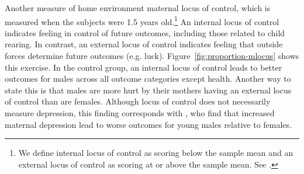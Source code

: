 Another measure of home environment maternal locus of control, which is measured when the subjects were 1.5 years old.\footnote{We define internal locus of control as scoring below the sample mean and an external locus of control as scoring at or above the sample mean. See \citet{Rotter_1966_PMGaA}.} An internal locus of control indicates feeling in control of future outcomes, including those related to child rearing. In contrast, an external locus of control indicates feeling that outside forces determine future outcomes (e.g. luck). Figure~\ref{fig:proportion-mlocus} shows this exercise. In the control group, an internal locus of control leads to better outcomes for males across all outcome categories except health. Another way to state this is that males are more hurt by their mothers having an external locus of control than are females. Although locus of control does not necessarily measure depression, this finding corresponds with \citet{Beeghly-etal_2017_IMHJ}, who find that increased maternal depression lead to worse outcomes for young males relative to females. 


